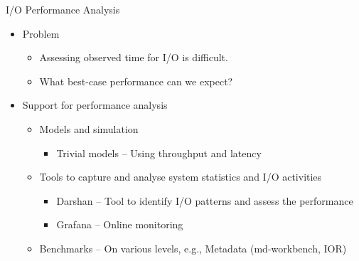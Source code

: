 \documentclass[compress,11pt,xcolor=svgnames,aspectratio=169]{beamer}
\begin{document}
\begin{frame}[fragile]{I/O Performance Analysis}

\begin{itemize}
\setlength\itemsep{0.3cm}

  \item Problem

    \begin{itemize}
    \item Assessing observed time for I/O is difficult.
    \item What best-case performance can we expect?
    \end{itemize}

  \item Support for performance analysis
  \setlength\itemsep{0.4cm}

    \begin{itemize}

    \item Models and simulation

      \begin{itemize}
        \item Trivial models -- Using throughput and latency
      \end{itemize}

    \item Tools to capture and analyse system statistics and I/O activities

      \begin{itemize}
        \item Darshan -- Tool to identify I/O patterns and assess the performance
        \item Grafana -- Online monitoring
      \end{itemize}

    \item Benchmarks -- On various levels, e.g., Metadata (md-workbench, IOR)

    \end{itemize}

\end{itemize}

\end{frame}
\end{document}
